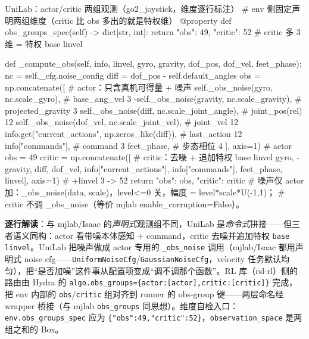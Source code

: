 \begin{codebox}[Python]{UniLab：actor/critic 两组观测（go2\_joystick，维度逐行标注）}
# env 侧固定声明两组维度（critic 比 obs 多出的就是特权维）
@property
def obs_groups_spec(self) -> dict[str, int]:
    return {"obs": 49, "critic": 52}          # critic 多 3 维 = 特权 base linvel

def _compute_obs(self, info, linvel, gyro, gravity, dof_pos, dof_vel, feet_phase):
    nc = self._cfg.noise_config
    diff = dof_pos - self.default_angles
    obs = np.concatenate([                     # actor：只含真机可得量 + 噪声
        self._obs_noise(gyro, nc.scale_gyro),          # base_ang_vel  3
        -self._obs_noise(gravity, nc.scale_gravity),   # projected_gravity 3
        self._obs_noise(diff, nc.scale_joint_angle),   # joint_pos(rel) 12
        self._obs_noise(dof_vel, nc.scale_joint_vel),  # joint_vel     12
        info.get("current_actions", np.zeros_like(diff)),  # last_action 12
        info["commands"],                              # command       3
        feet_phase,                                    # 步态相位       4
    ], axis=1)                                          # actor obs = 49
    critic = np.concatenate([                  # critic：去噪 + 追加特权 base linvel
        gyro, -gravity, diff, dof_vel, info["current_actions"],
        info["commands"], feet_phase, linvel], axis=1)  # +linvel 3 -> 52
    return {"obs": obs, "critic": critic}
# 噪声仅 actor 加：_obs_noise(data, scale)，level<=0 关，幅度 = level*scale*U(-1,1)；
# critic 不调 _obs_noise（等价 mjlab enable_corruption=False）。
\end{codebox}

\textbf{逐行解读}：与 mjlab/Isaac 的\emph{声明式}观测组不同，UniLab 是\emph{命令式}拼接——但三者语义同构：actor 看带噪本体感知 + command，critic 去噪并追加特权 \verb|base linvel|。UniLab 把噪声做成 actor 专用的 \verb|_obs_noise| 调用（mjlab/Isaac 都用声明式 noise cfg——\verb|UniformNoiseCfg|/\verb|GaussianNoiseCfg|，velocity 任务默认均匀），把“是否加噪”这件事从配置项变成“调不调那个函数”。RL 库（rsl-rl）侧的路由由 Hydra 的 \verb|algo.obs_groups={actor:[actor],critic:[critic]}| 完成，把 env 内部的 \verb|obs|/\verb|critic| 组对齐到 runner 的 obs-group 键——两层命名经 wrapper 桥接（与 mjlab \verb|obs_groups| 同思想）。维度自检入口：\verb|env.obs_groups_spec| 应为 \verb|{"obs":49,"critic":52}|，\verb|observation_space| 是两组之和的 Box。

